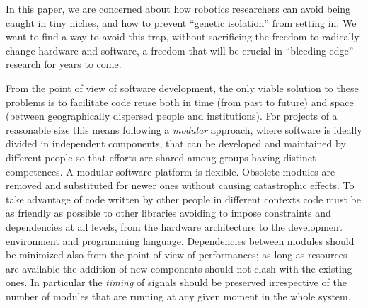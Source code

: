 





%

In this paper, we are concerned
about how robotics researchers can avoid being caught in tiny
niches, and how to prevent ``genetic isolation'' from setting in.
We want to find a way to avoid this trap, without sacrificing
the freedom to radically change hardware and software, a freedom 
that will be crucial in ``bleeding-edge'' research for years to 
come.

From the point of view of software development, the only viable 
solution to these problems is to facilitate 
code reuse both in time (from past to future) and space
(between geographically dispersed people and 
institutions). For projects of a reasonable size this means following
a \emph{modular} approach, where software is ideally divided in 
independent components, that can be developed and maintained 
by different people so that efforts 
are shared among groups having distinct competences. A 
modular software platform is flexible. Obsolete modules are 
removed and substituted for newer ones without causing 
catastrophic effects. To take advantage of code written by 
other people in different contexts code must be as friendly 
as possible to other libraries avoiding to impose constraints 
and dependencies at all levels, from the hardware architecture 
to the development environment and programming language. 
Dependencies between modules should be 
minimized also from the point of view of performances; as 
long as resources are available the addition of new 
components should not clash with the existing ones. In 
particular the \emph{timing} of signals should be preserved 
irrespective of the number of modules that are running 
at any given moment in the whole system. 

